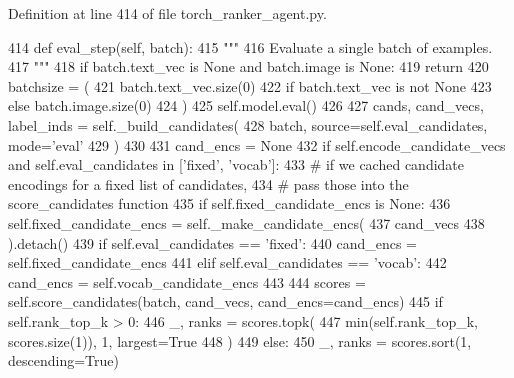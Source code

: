 Definition at line 414 of file torch\+\_\+ranker\+\_\+agent.\+py.


\begin{DoxyCode}
414     \textcolor{keyword}{def }eval\_step(self, batch):
415         \textcolor{stringliteral}{"""}
416 \textcolor{stringliteral}{        Evaluate a single batch of examples.}
417 \textcolor{stringliteral}{        """}
418         \textcolor{keywordflow}{if} batch.text\_vec \textcolor{keywordflow}{is} \textcolor{keywordtype}{None} \textcolor{keywordflow}{and} batch.image \textcolor{keywordflow}{is} \textcolor{keywordtype}{None}:
419             \textcolor{keywordflow}{return}
420         batchsize = (
421             batch.text\_vec.size(0)
422             \textcolor{keywordflow}{if} batch.text\_vec \textcolor{keywordflow}{is} \textcolor{keywordflow}{not} \textcolor{keywordtype}{None}
423             \textcolor{keywordflow}{else} batch.image.size(0)
424         )
425         self.model.eval()
426 
427         cands, cand\_vecs, label\_inds = self.\_build\_candidates(
428             batch, source=self.eval\_candidates, mode=\textcolor{stringliteral}{'eval'}
429         )
430 
431         cand\_encs = \textcolor{keywordtype}{None}
432         \textcolor{keywordflow}{if} self.encode\_candidate\_vecs \textcolor{keywordflow}{and} self.eval\_candidates \textcolor{keywordflow}{in} [\textcolor{stringliteral}{'fixed'}, \textcolor{stringliteral}{'vocab'}]:
433             \textcolor{comment}{# if we cached candidate encodings for a fixed list of candidates,}
434             \textcolor{comment}{# pass those into the score\_candidates function}
435             \textcolor{keywordflow}{if} self.fixed\_candidate\_encs \textcolor{keywordflow}{is} \textcolor{keywordtype}{None}:
436                 self.fixed\_candidate\_encs = self.\_make\_candidate\_encs(
437                     cand\_vecs
438                 ).detach()
439             \textcolor{keywordflow}{if} self.eval\_candidates == \textcolor{stringliteral}{'fixed'}:
440                 cand\_encs = self.fixed\_candidate\_encs
441             \textcolor{keywordflow}{elif} self.eval\_candidates == \textcolor{stringliteral}{'vocab'}:
442                 cand\_encs = self.vocab\_candidate\_encs
443 
444         scores = self.score\_candidates(batch, cand\_vecs, cand\_encs=cand\_encs)
445         \textcolor{keywordflow}{if} self.rank\_top\_k > 0:
446             \_, ranks = scores.topk(
447                 min(self.rank\_top\_k, scores.size(1)), 1, largest=\textcolor{keyword}{True}
448             )
449         \textcolor{keywordflow}{else}:
450             \_, ranks = scores.sort(1, descending=\textcolor{keyword}{True})

\end{DoxyCode}
